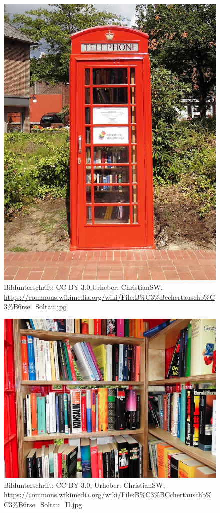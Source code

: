 \documentclass[a4paper,
fontsize=11pt,
oneside,
numbers=noperiodatend,
parskip=half-,
bibliography=totoc,
final
]{scrartcl}
\begin{document}
\begin{figure}[htbp]
\centering
\includegraphics{img/BuchertauschborseSoltau.jpg}
\caption{Bildunterschrift: CC-BY-3.0,Urheber: ChristianSW,
\url{https://commons.wikimedia.org/wiki/File:B\%C3\%Bcchertauschb\%C3\%B6rse_Soltau.jpg}}
\end{figure}

\begin{figure}[htbp]
\centering
\includegraphics{img/BuchertauschborseSoltauII.jpg}
\caption{Bildunterschrift: CC-BY-3.0, Urheber: ChristianSW,
\url{https://commons.wikimedia.org/wiki/File:B\%C3\%BCchertauschb\%C3\%B6rse_Soltau_II.jpg}}
\end{figure}
\end{document}
